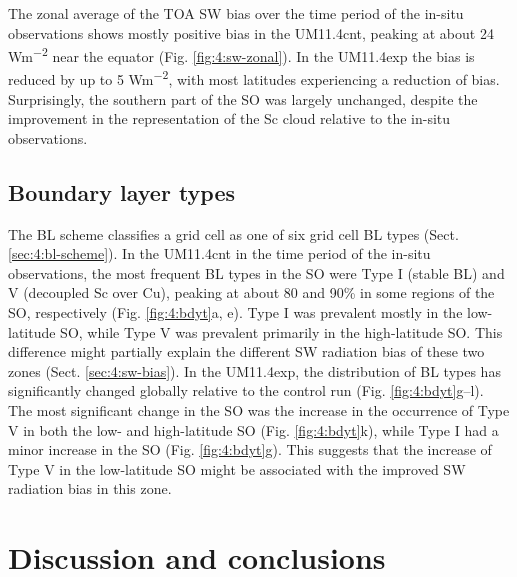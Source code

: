 The zonal average of the TOA SW bias over the time period of the in-situ
observations shows mostly positive bias in the
UM11.4cnt, peaking at about 24 \unit{Wm^{-2}} near the equator (Fig. \ref{fig:4:sw-zonal}). In the
UM11.4exp the bias is reduced by up to 5 \unit{Wm^{-2}}, with most
latitudes experiencing a reduction of bias. Surprisingly, the southern
part of the SO was largely unchanged, despite the improvement in the
representation of the Sc cloud relative to the in-situ observations.

\subsection{Boundary layer types}
\label{sec:4:bl-types}


The BL scheme classifies a grid cell as one of six grid cell BL types
(Sect. \ref{sec:4:bl-scheme}). In the UM11.4cnt in the time period of the in-situ observations,
the most frequent BL types in the SO were Type I (stable BL) and V (decoupled Sc
over Cu), peaking at about 80 and 90\% in some regions of the SO, respectively
(Fig. \ref{fig:4:bdyt}a, e).
Type I was prevalent mostly in the low-latitude SO, while Type V was
prevalent primarily in the high-latitude SO. This difference might partially explain
the different SW radiation bias of these two zones (Sect. \ref{sec:4:sw-bias}). %
In the UM11.4exp, the distribution of BL types has significantly changed
globally relative to the control run (Fig. \ref{fig:4:bdyt}g--l). The most significant change in the SO
was the increase in the occurrence of Type V in both the low- and high-latitude SO (Fig.
\ref{fig:4:bdyt}k), while Type I had a minor increase in the SO (Fig.
\ref{fig:4:bdyt}g). This suggests that the increase of Type V in the low-latitude
SO might be associated with the improved SW radiation bias in this zone.

\section{Discussion and conclusions}
\label{sec:4:conclusions}

